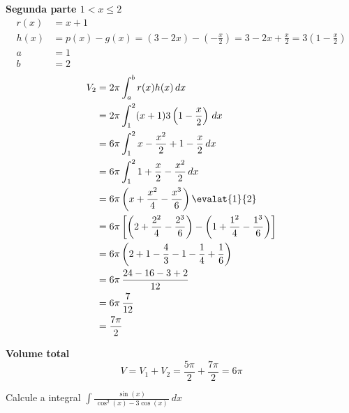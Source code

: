 \documentclass[a4paper,12pt,fleqn]{article}
\begin{document}
\begin{answer}
  \textbf{Segunda parte $1<x\leq 2$}
  \begin{align*}
    r(x) & = x + 1           \\
    h(x) & = p(x) - g(x)
           = \left(3-2x\right) -\left(-\frac{x}{2}\right)
           = 3 -2x +\frac{x}{2}
           = 3\left(1 -\frac{x}{2}\right) \\
    a    & = 1               \\
    b    & = 2
  \end{align*}
  \vspace{-2\baselineskip}
  \begin{align*}
    V_2 & = 2\pi \int_a^b r(x) h(x) \, dx                               \\
        & = 2\pi \int_1^2 (x+1) 3\left(1 -\frac{x}{2}\right) \, dx      \\
        & = 6\pi \int_1^2 x -\frac{x^2}{2} + 1 -\frac{x}{2}\, dx        \\
        & = 6\pi \int_1^2 1 + \frac{x}{2} -\frac{x^2}{2} \, dx          \\
        & = 6\pi \left(x +\frac{x^2}{4} - \frac{x^3}{6}\right)\evalat{1}{2}  \\
        & = 6\pi \left[
                 \left(2 +\frac{2^2}{4} - \frac{2^3}{6}\right)
               - \left(1 +\frac{1^2}{4} - \frac{1^3}{6}\right)
                 \right]  \\
        & = 6\pi \left(
                 2 + 1 - \frac{4}{3}
                -1 -\frac{1}{4} + \frac{1}{6}
                 \right)  \\
        & = 6\pi \,\frac{24 -16 -3 + 2}{12}  \\
        & = 6\pi \,\frac{7}{12} \\
        & = \frac{7\pi}{2}
  \end{align*}


  \textbf{Volume total}
  \[
    V
    = V_1 + V_2
    = \frac{5\pi}{2} + \frac{7\pi}{2}
    = 6\pi
  \]

\end{answer}

Calcule a integral
\(
  \int \frac{\sin(x)}{\,\cos^2(x)- 3\cos(x)\,}\, dx
\)
\end{document}
